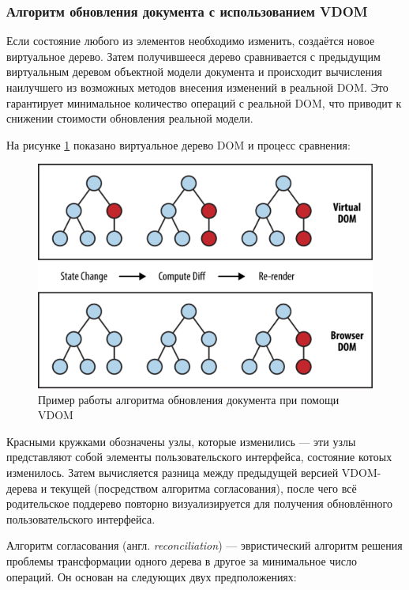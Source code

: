 \subsubsection{Алгоритм обновления документа с использованием VDOM}

Если состояние любого из элементов необходимо изменить, создаётся новое виртуальное дерево.
Затем получившееся дерево сравнивается с предыдущим виртуальным деревом объектной модели документа и происходит вычисления наилучшего из возможных методов внесения изменений в реальной DOM. 
Это гарантирует минимальное количество операций с реальной DOM, что приводит к снижении стоимости обновления реальной модели. 

На рисунке \ref{fig:vdom-example} показано виртуальное дерево DOM и процесс сравнения: 

\begin{figure}[h]
	\centering
	\includegraphics[width=130mm]{img/vdom-example.png}
	\caption{Пример работы алгоритма обновления документа при помощи VDOM}
	\label{fig:vdom-example}
\end{figure}
\clearpage

Красными кружками обозначены узлы, которые изменились --- эти узлы представляют собой элементы пользовательского интерфейса, состояние котоых изменилось.
Затем вычисляется разница между предыдущей версией VDOM-дерева и текущей (посредством алгоритма согласования), после чего всё родительское поддерево повторно визуализируется для получения обновлённого пользовательского интерфейса.


Алгоритм согласования (англ. \textit{reconciliation}) \cite{reconciliation} --- эвристический алгоритм решения проблемы трансформации одного дерева в другое за минимальное число операций.
Он основан на следующих двух предположениях:

